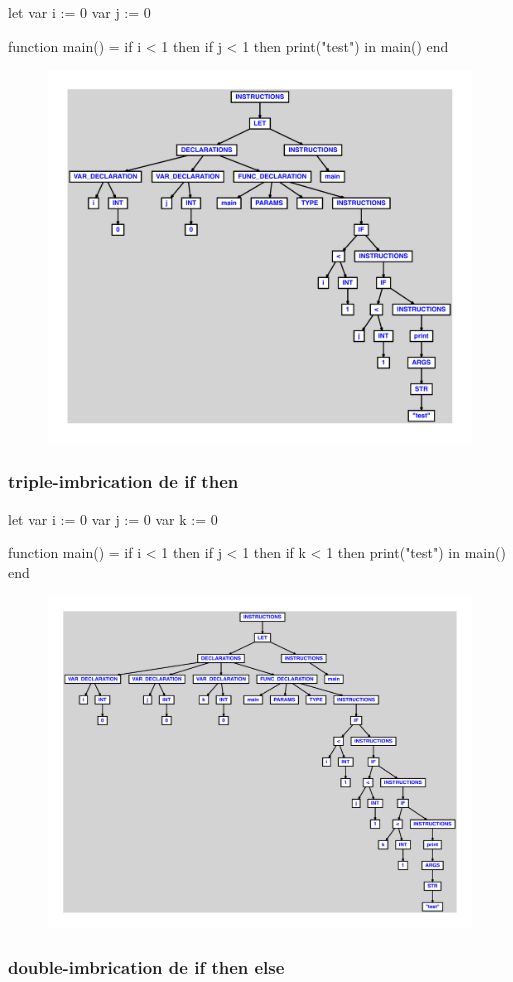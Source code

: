 \documentclass{article}
\begin{document}
\begin{verbatimtab}
let
	var i := 0
	var j := 0

	function main() =
		if i < 1 then
			if j < 1 then
				print("test")
in main() end
\end{verbatimtab}
\begin{figure}[H]\centering\includegraphics[max width=\textwidth]{ast/ast_254.pdf}\end{figure}\subsubsection{triple-imbrication de if then}
\begin{verbatimtab}
let
	var i := 0
	var j := 0
	var k := 0

	function main() =
		if i < 1 then
			if j < 1 then
				if k < 1 then
					print("test")
in main() end
\end{verbatimtab}
\begin{figure}[H]\centering\includegraphics[max width=\textwidth]{ast/ast_255.pdf}\end{figure}\subsubsection{double-imbrication de if then else}
\end{document}
